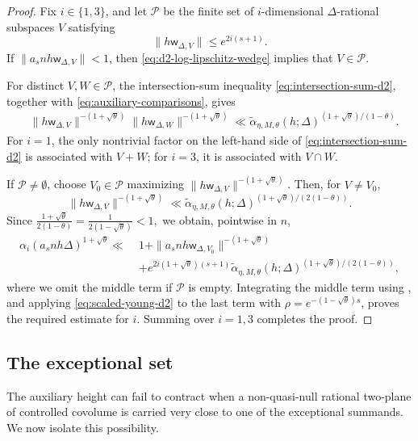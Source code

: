 \documentclass[reqno,11pt]{amsart}
\theoremstyle{definition}
\theoremstyle{remark}
\numberwithin{equation}{section}
\begin{document}
\begin{proof}
Fix $i\in\{1,3\}$, and let $\mathcal P$ be the finite set of
$i$-dimensional $\Delta$-rational subspaces $V$ satisfying
$$
\|h\mathsf w_{\Delta,V}\|\le e^{2i(s+1)}.
$$
If $\|a_snh\mathsf w_{\Delta,V}\|<1$, then
\eqref{eq:d2-log-lipschitz-wedge} implies that $V\in\mathcal P$.

For distinct $V,W\in\mathcal P$, the intersection-sum inequality
\eqref{eq:intersection-sum-d2}, together with
\eqref{eq:auxiliary-comparisons}, gives
$$
\begin{aligned}
&\|h\mathsf w_{\Delta,V}\|^{-(1+\sqrt\theta)}
\|h\mathsf w_{\Delta,W}\|^{-(1+\sqrt\theta)}\ll
\widetilde\alpha_{\eta,M,\theta}(h;\Delta)^{
(1+\sqrt\theta)/(1-\theta)}.
\end{aligned}
$$
For $i=1$, the only nontrivial factor on the left-hand side of
\eqref{eq:intersection-sum-d2} is associated with $V+W$; for $i=3$, it
is associated with $V\cap W$.

If $\mathcal P\ne\emptyset$, choose $V_0\in\mathcal P$ maximizing
$\|h\mathsf w_{\Delta,V}\|^{-(1+\sqrt\theta)}$. Then, for
$V\ne V_0$,
$$
\|h\mathsf w_{\Delta,V}\|^{-(1+\sqrt\theta)}
\ll
\widetilde\alpha_{\eta,M,\theta}(h;\Delta)^{
(1+\sqrt\theta)/(2(1-\theta))}.
$$
Since
$
\frac{1+\sqrt\theta}{2(1-\theta)}
=
\frac{1}{2(1-\sqrt\theta)}
<1,
$
we obtain, pointwise in $n$,
$$
\begin{aligned}
\alpha_i(a_snh\Delta)^{1+\sqrt\theta}
\ll\;&
1+
\|a_snh\mathsf w_{\Delta,V_0}\|^{-(1+\sqrt\theta)}\\
&+
e^{2i(1+\sqrt\theta)(s+1)}
\widetilde\alpha_{\eta,M,\theta}(h;\Delta)^{
(1+\sqrt\theta)/(2(1-\theta))},
\end{aligned}
$$
where we omit the middle term if $\mathcal P$ is empty. Integrating the
middle term using , and applying
\eqref{eq:scaled-young-d2} to the last term with
$\rho=e^{-(1-\sqrt\theta)s}$, proves the required estimate for $i$.
Summing over $i=1,3$ completes the proof.
\end{proof}


\subsection{The exceptional set}

The auxiliary height can fail to contract when a non-quasi-null rational
two-plane of controlled covolume is carried very close to one of the
exceptional summands. We now isolate this possibility.
\end{document}
